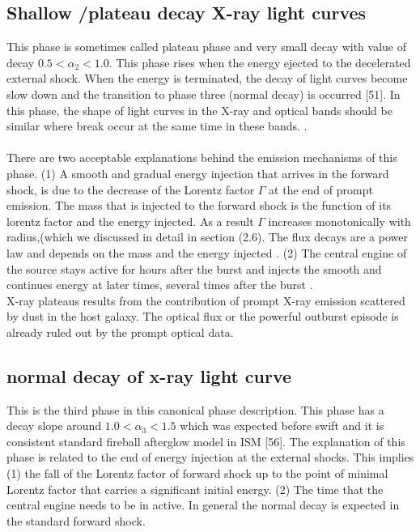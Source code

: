 \subsection{Shallow /plateau decay X-ray light curves }
This phase is sometimes called plateau phase and very small decay with value of decay
$0.5 < \alpha_{2} < 1.0 $. This phase rises when the energy ejected to the decelerated external shock. When the energy is terminated, the decay of light curves become slow down and the transition to phase three (normal decay) is occurred [51]. In this phase, the shape of light curves in the X-ray and optical bands should be similar where break occur at the same time in these bands.\citep{38}\citep{39} .\\\\
There are two acceptable explanations behind the emission mechanisms of this
phase. (1) A smooth and gradual energy injection that arrives in the forward shock,
is due to the decrease of the Lorentz factor $ \Gamma $ at the end of prompt emission. The mass that is injected to the forward shock is the function of its lorentz factor and the energy injected. As a result $ \Gamma $ increases monotonically with radius,(which we discussed in detail in section (2.6). The flux decays are a power law and depends on the mass and the energy injected . (2) The central engine of the source stays active for hours after the burst and injects the smooth and continues energy at later times, several times after the burst\citep{40} \citep{41}.\\
X-ray plateaus results from the contribution of prompt X-ray emission scattered
by dust in the host galaxy. The optical flux or the powerful outburst episode is
already ruled out by the prompt optical data\citep{42}.\\
\subsection{normal decay of x-ray light curve}
This is the third phase in this canonical phase description. This phase has a decay
slope around $1.0 < \alpha_{3} < 1.5$ which was expected before swift and it is consistent standard fireball afterglow model in ISM [56]. The explanation of this phase is related to the end of energy injection at the external shocks.
This implies (1) the fall of the Lorentz factor of forward shock up to the point of
minimal Lorentz factor that carries a significant initial energy. (2) The time that the central engine needs to be in active. In general the normal decay is expected in the standard forward shock.\citep{43}
